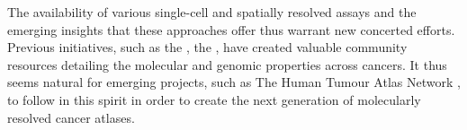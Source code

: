 The availability of various single-cell and spatially resolved assays and the emerging insights that these approaches offer thus warrant new concerted efforts. Previous initiatives, such as the \textcite{Cancer_Genome_Atlas_Research_Network2013-ox}, the \textcite{International_Cancer_Genome_Consortium2010-ww, ICGCTCGA_Pan-Cancer_Analysis_of_Whole_Genomes_Consortium2020-vu}, have created valuable community resources detailing the molecular and genomic properties across cancers. It thus seems natural for emerging projects, such as The Human Tumour Atlas Network \parencite{Rozenblatt-Rosen2020-bl}, to follow in this spirit in order to create the next generation of molecularly resolved cancer atlases.










